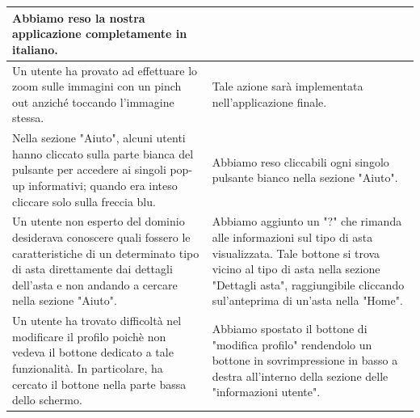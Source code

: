 \begin{center}
\begin{longtable}{|C{7.35cm}|C{7.35cm}|}
                    Abbiamo reso la nostra applicazione completamente in italiano.\\
                \hline
                    Un utente ha provato ad effettuare lo zoom sulle immagini con un pinch out anziché toccando l’immagine stessa. & 
                    Tale azione sarà implementata nell'applicazione finale.\\
                \hline
                    Nella sezione "Aiuto", alcuni utenti hanno cliccato sulla parte bianca del pulsante per accedere ai singoli pop-up informativi; quando era inteso cliccare solo sulla freccia blu. &
                    Abbiamo reso cliccabili ogni singolo pulsante bianco nella sezione "Aiuto".\\
                \hline
                    Un utente non esperto del dominio desiderava conoscere quali fossero le caratteristiche di un determinato tipo di asta direttamente dai dettagli dell'asta e non andando a cercare nella sezione "Aiuto". &
                    Abbiamo aggiunto un "?" che rimanda alle informazioni sul tipo di asta visualizzata. Tale bottone si trova vicino al tipo di asta nella sezione "Dettagli asta", raggiungibile cliccando sul'anteprima di un'asta nella "Home".\\
                \hline
                    Un utente ha trovato difficoltà nel modificare il profilo poichè non vedeva il bottone dedicato a tale funzionalità. In particolare, ha cercato il bottone nella parte bassa dello schermo. &
                    Abbiamo spostato il bottone di "modifica profilo" rendendolo un bottone in sovrimpressione in basso a destra all'interno della sezione delle "informazioni utente". \\
                \hline
            \end{longtable}
            \end{center}